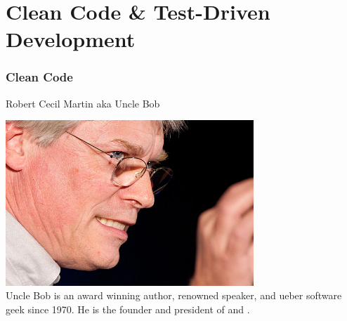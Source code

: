 \part[Clean Code \& TDD]{Clean Code \& Test-Driven Development}
\section{Clean Code}
\begin{frame}{Robert Cecil Martin aka Uncle Bob}
\begin{center}
\includegraphics[width=0.7\textwidth]{resources/BobAtRails.jpg}\\
Uncle Bob is an award winning author, renowned speaker, and ueber software
geek since 1970. He is the founder and president of
 and .
\end{center}
\end{frame}

